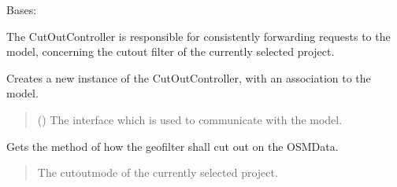 \documentclass[letterpaper,10pt,english]{sphinxmanual}
\begin{document}
\begin{fulllineitems}
\label{\detokenize{apidoc/src.osm_configurator.control:src.osm_configurator.control.cut_out_controller.CutOutController}}
\pysigstartsignatures
{}
\pysigstopsignatures
\sphinxAtStartPar
Bases: 

\sphinxAtStartPar
The CutOutController is responsible for consistently forwarding requests to the model,
concerning the cut\sphinxhyphen{}out filter of the currently selected project.

\begin{fulllineitems}
\label{\detokenize{apidoc/src.osm_configurator.control:src.osm_configurator.control.cut_out_controller.CutOutController.__init__}}
\pysigstartsignatures
{}
\pysigstopsignatures
\sphinxAtStartPar
Creates a new instance of the CutOutController, with an association to the model.
\begin{quote}\begin{description}
\sphinxAtStartPar
{} ({\hyperref[\detokenize{apidoc/src.osm_configurator.model.application:src.osm_configurator.model.application.application_interface.IApplication}]{}}) \textendash{} The interface which is used to communicate with the model.

\end{description}\end{quote}

\end{fulllineitems}


\begin{fulllineitems}
\label{\detokenize{apidoc/src.osm_configurator.control:src.osm_configurator.control.cut_out_controller.CutOutController.get_cut_out_mode}}
\pysigstartsignatures
{}
\pysigstopsignatures
\sphinxAtStartPar
Gets the method of how the geofilter shall cut out on the OSM\sphinxhyphen{}Data.
\begin{quote}\begin{description}
\sphinxAtStartPar
The cut\sphinxhyphen{}out\sphinxhyphen{}mode of the currently selected project.


\end{description}
\end{quote}
\end{fulllineitems}
\end{fulllineitems}
\end{document}
